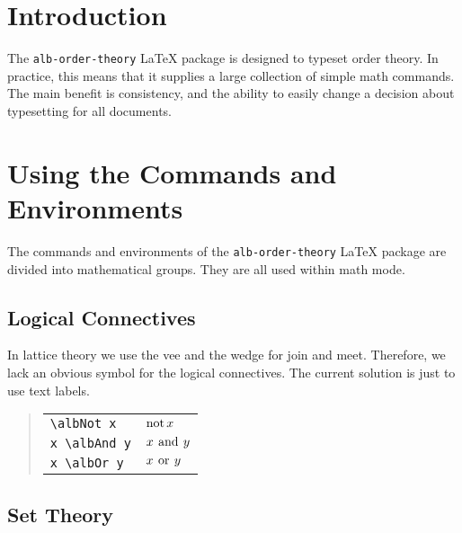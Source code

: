 \documentclass[11pt,a4paper,oneside]{alb-corp}
\begin{document}

\section{Introduction}
\label{sec:alb-order-theory-documentation:intr}

The \texttt{alb-order-theory} \LaTeX{} package is designed to typeset
order theory.  In practice, this means that it supplies a large
collection of simple math commands.  The main benefit is consistency,
and the ability to easily change a decision about typesetting for all
documents.




\section{Using the Commands and Environments}
\label{sec:alb-order-theory-documentation:using-comm-envir}

The commands and environments of the \texttt{alb-order-theory} \LaTeX{}
package are divided into mathematical groups.  They are all used within
math mode.



\subsection{Logical Connectives}
\label{sec:alb-order-theory-documentation:logical-conn}

In lattice theory we use the vee and the wedge for join and meet.
Therefore, we lack an obvious symbol for the logical connectives.  The
current solution is just to use text labels.

\begin{quote}
  \begin{tabular}{p{}@{\qquad}p{}}
    \verb$\albNot x$ & $\mathop{\mathrm{not}} x$ \\
    \verb$x \albAnd y$ & $x \mathbin{\,\mathrm{and}\,} y$ \\
    \verb$x \albOr y$ & $x \mathbin{\,\mathrm{or}\,} y$
  \end{tabular}
\end{quote}



\subsection{Set Theory}
\label{sec:alb-order-theory-documentation:set-theory}
\end{document}
